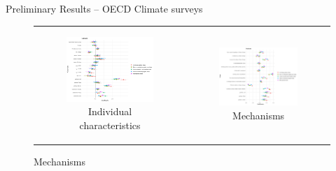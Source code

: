 \documentclass{article}
\begin{document}
\begin{LARGE}
	\begin{center}
		Preliminary Results – OECD Climate surveys	
	\end{center}
	
\end{LARGE}
	\tableofcontents
	\listoffigures

\clearpage

\begin{figure}[h!]
\begin{center}
	\caption{Decomposing Tax Policy Views}
	\setlength\extrarowheight{-1pt}
	\begin{tabular}{cc}
		\begin{subfigure}{0.5\textwidth}
		\caption{Individual characteristics}
			\includegraphics[width=\textwidth]{coef_policy_views_all}
		\end{subfigure}&
		\begin{subfigure}{0.5\textwidth}
		\caption{Mechanisms}
			\includegraphics[width=\textwidth]{coef_policy_views_indexes_all}
		\end{subfigure}\\
	\end{tabular}
\end{center}


\end{figure}
\end{document}
